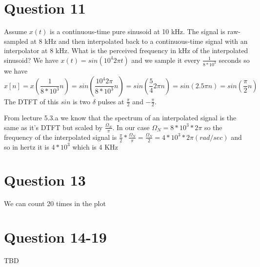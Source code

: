 \documentclass[a4paper]{article}
\begin{document}
\section{Question 11}
Assume $x(t)$ is a continuous-time pure sinusoid at 10 kHz. The signal is raw-sampled at 8 kHz and then interpolated back to a continuous-time signal with an interpolator at 8 kHz. What is the perceived frequency in kHz of the interpolated sinusoid?
\newline
\newline
We have $x(t) = sin(10^4 2\pi t)$ and we sample it every $\frac{1}{8*10^3}$ seconds so we have 
$$x[n] = x(\frac{1}{8*10^3}n) = sin(\frac{10^4 2\pi}{8*10^3}n) = sin(\frac{5}{4}2\pi n) = sin(2.5 \pi n) = sin(\frac{\pi}{2}n)$$
The DTFT of this $sin$ is two $\delta$ pulses at $\frac{\pi}{2}$ and $-\frac{\pi}{2}$.

From lecture 5.3.a we know that the spectrum of an interpolated signal is the same as it's DTFT but
scaled by $\frac{\Omega_N}{\pi}$. In our case $\Omega_N = 8*10^3*2\pi$ so the frequency of the interpolated signal is $\frac{\pi}{2} * \frac{\Omega_N}{\pi} = \frac{\Omega_N}{2} = 4*10^3*2\pi(rad/sec)$ and so in hertz it is  $4 * 10^3$ which is 4 KHz

\section{Question 13}
We can count 20 times in the plot

\section{Question 14-19}
TBD
\end{document}

